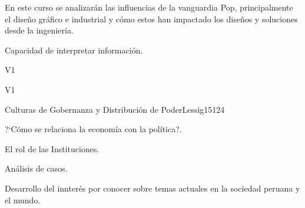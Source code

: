 \begin{syllabus}


\begin{justification}
En este curso se analizarán las influencias de la vanguardia Pop, principalmente el diseño gráfico e  industrial y cómo estos han impactado los diseños y soluciones desde la ingeniería. 
\end{justification}

\begin{goals}
\item Capacidad de interpretar información.
\end{goals}

\begin{outcomes}{V1}
    \item {}
    \item {}
    \item {}
    
\end{outcomes}

\begin{competences}{V1}
    \item {}
    \item {}
    \item {}
    \item {}
\end{competences}

\begin{unit}{Culturas de Gobernanza y Distribución de Poder}{}{Lessig15}{12}{4}
   \begin{topics}
      \item ?`Cómo se relaciona la economía con la política?.
      \item El rol de las Instituciones.
      \item Análisis de casos.
   \end{topics}
   \begin{learningoutcomes}
      \item Desarrollo del innterés por conocer sobre temas actuales en la sociedad peruana y el mundo.
   \end{learningoutcomes}
\end{unit}

\begin{coursebibliography}
\end{coursebibliography}

\end{syllabus}
